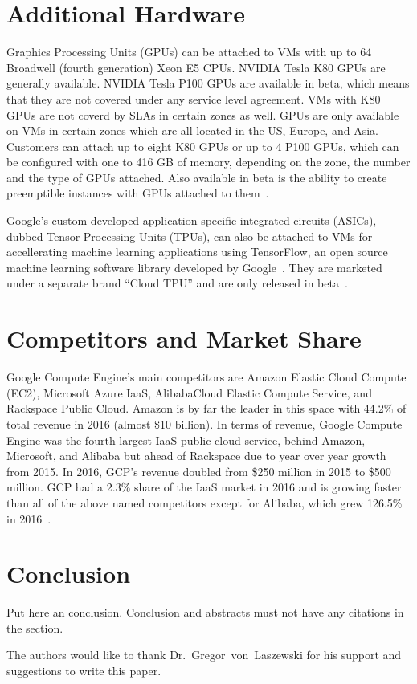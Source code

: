 \section{Additional Hardware}
Graphics Processing Units (GPUs) can be attached to VMs with up to 64
Broadwell (fourth generation) Xeon E5 CPUs. NVIDIA Tesla K80 GPUs are
generally available. NVIDIA Tesla P100 GPUs are available in beta,
which means that they are not covered under any service level
agreement. VMs with K80 GPUs are not coverd by SLAs in certain zones
as well. GPUs are only available on VMs in certain zones which are all
located in the US, Europe, and Asia. Customers can attach up to eight
K80 GPUs or up to 4 P100 GPUs, which can be configured with one to 416
GB of memory, depending on the zone, the number and the type of GPUs
attached. Also available in beta is the ability to create preemptible
instances with GPUs attached to them~\cite{hid-sp18-419-gce-gpus}.

Google's custom-developed application-specific integrated circuits
(ASICs), dubbed Tensor Processing Units (TPUs), can also be attached
to VMs for accellerating machine learning applications using
TensorFlow, an open source machine learning software library developed
by Google~\cite{hid-sp18-419-tensorflow}. They are marketed under a
separate brand ``Cloud TPU'' and are only released in
beta~\cite{hid-sp18-419-cloud-tpu}.

\section{Competitors and Market Share}

Google Compute Engine's main competitors are Amazon Elastic Cloud
Compute (EC2), Microsoft Azure IaaS, AlibabaCloud Elastic Compute
Service, and Rackspace Public Cloud. Amazon is by far the leader in
this space with 44.2\% of total revenue in 2016 (almost \$10
billion). In terms of revenue, Google Compute Engine was the fourth
largest IaaS public cloud service, behind Amazon, Microsoft, and
Alibaba but ahead of Rackspace due to year over year growth from
2015. In 2016, GCP's revenue doubled from \$250 million in 2015
to \$500 million. GCP had a 2.3\% share of the IaaS market in 2016 and
is growing faster than all of the above named competitors except for
Alibaba, which grew 126.5\% in
2016~\cite{hid-sp18-419-gartnerpr2017}.


\section{Conclusion}

Put here an conclusion. Conclusion and abstracts must not have any
citations in the section.


\begin{acks}

  The authors would like to thank Dr.~Gregor~von~Laszewski for his
  support and suggestions to write this paper.

\end{acks}


 


